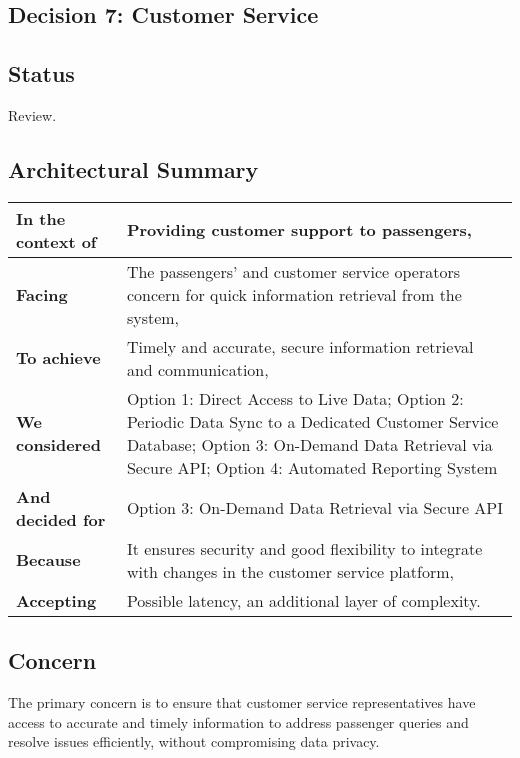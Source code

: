 \subsection{Decision 7: Customer Service}

\subsection*{Status}
Review.

\subsection*{Architectural Summary}
\begin{tabular}{|p{3.5cm}|p{10.5cm}|}
    \hline
    \textbf{In the context of} & Providing customer support to passengers, \\
    \hline
    \textbf{Facing} & The passengers' and customer service operators concern for quick information retrieval from the system, \\
    \hline
    \textbf{To achieve} & Timely and accurate, secure information retrieval and communication, \\
    \hline
    \textbf{We considered} & Option 1: Direct Access to Live Data; Option 2: Periodic Data Sync to a Dedicated Customer Service Database; Option 3: On-Demand Data Retrieval via Secure API; Option 4: Automated Reporting System\\
    \hline
    \textbf{And decided for} & Option 3: On-Demand Data Retrieval via Secure API \\
    \hline
    \textbf{Because} & It ensures security and good flexibility to integrate with changes in the customer service platform, \\
    \hline
    \textbf{Accepting} & Possible latency, an additional layer of complexity. \\
    \hline
\end{tabular}

\subsection*{Concern}
The primary concern is to ensure that customer service representatives have access to accurate and timely information to address passenger queries and resolve issues efficiently, without compromising data privacy.

